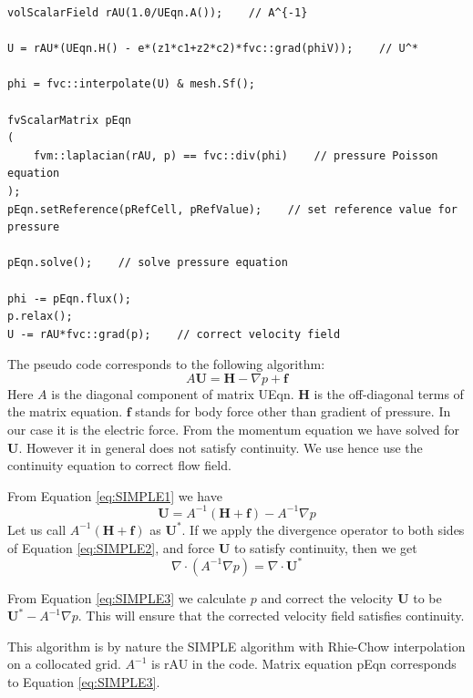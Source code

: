 \begin{lstlisting}
volScalarField rAU(1.0/UEqn.A());    // A^{-1}

U = rAU*(UEqn.H() - e*(z1*c1+z2*c2)*fvc::grad(phiV));    // U^*
    
phi = fvc::interpolate(U) & mesh.Sf();    

fvScalarMatrix pEqn
(
    fvm::laplacian(rAU, p) == fvc::div(phi)    // pressure Poisson equation
);
pEqn.setReference(pRefCell, pRefValue);    // set reference value for pressure

pEqn.solve();    // solve pressure equation

phi -= pEqn.flux();
p.relax();
U -= rAU*fvc::grad(p);    // correct velocity field
\end{lstlisting}

The pseudo code corresponds to the following algorithm:
\begin{equation}
A \mathbf{U} = \mathbf{H} - \nabla p + \mathbf{f}
\label{eq:SIMPLE1}
\end{equation}
Here $A$ is the diagonal component of matrix \textsf{UEqn}. $\mathbf{H}$ is the off-diagonal terms of the matrix equation. $\mathbf{f}$ stands for body force other than gradient of pressure. In our case it is the electric force. From the momentum equation we have solved for $\mathbf{U}$. However it in general does not satisfy continuity. We use hence use the continuity equation to correct flow field.

From Equation \ref{eq:SIMPLE1} we have 
\begin{equation}
\mathbf{U} = A^{-1}(\mathbf{H}+\mathbf{f}) - A^{-1}\nabla p
\label{eq:SIMPLE2}
\end{equation}
Let us call $A^{-1}(\mathbf{H}+\mathbf{f})$ as $\mathbf{U}^*$. If we apply the divergence operator to both sides of Equation \ref{eq:SIMPLE2}, and force $\mathbf{U}$ to satisfy continuity, then we get
\begin{equation}
\nabla \cdot \left(A^{-1}\nabla p\right) = \nabla \cdot \mathbf{U}^*
\label{eq:SIMPLE3}
\end{equation}

From Equation \ref{eq:SIMPLE3} we calculate $p$ and correct the velocity $\mathbf{U}$ to be $\mathbf{U}^* - A^{-1}\nabla p$. This will ensure that the corrected velocity field satisfies continuity.

This algorithm is by nature the SIMPLE algorithm with Rhie-Chow interpolation on a collocated grid. $A^{-1}$ is \textsf{rAU} in the code. Matrix equation \textsf{pEqn} corresponds to Equation \ref{eq:SIMPLE3}.

